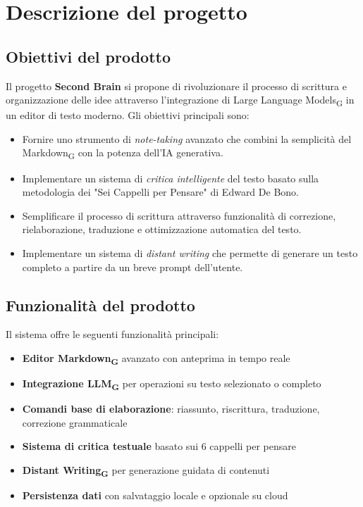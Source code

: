 \documentclass[11pt,a4paper]{article}
\begin{document}
\newpage

\section{Descrizione del progetto}
\subsection{Obiettivi del prodotto}
Il progetto \textbf{Second Brain} si propone di rivoluzionare il processo di scrittura e organizzazione delle idee attraverso l'integrazione di Large Language Models\textsubscript{G} in un editor di testo moderno. Gli obiettivi principali sono:

\begin{itemize}
    \item Fornire uno strumento di \textit{note-taking} avanzato che combini la semplicità del Markdown\textsubscript{G} con la potenza dell'IA generativa.
    \item Implementare un sistema di \textit{critica intelligente} del testo basato sulla metodologia dei "Sei Cappelli per Pensare" di Edward De Bono.
    \item Semplificare il processo di scrittura attraverso funzionalità di correzione, rielaborazione, traduzione e ottimizzazione automatica del testo.
    \item Implementare un sistema di \textit{distant writing} che permette di generare un testo completo a partire da un breve prompt dell'utente.
\end{itemize}


\subsection{Funzionalità del prodotto}
Il sistema offre le seguenti funzionalità principali:

\begin{itemize}
    \item \textbf{Editor Markdown\textsubscript{G}} avanzato con anteprima in tempo reale
    \item \textbf{Integrazione LLM\textsubscript{G}} per operazioni su testo selezionato o completo
    \item \textbf{Comandi base di elaborazione}: riassunto, riscrittura, traduzione, correzione grammaticale
    \item \textbf{Sistema di critica testuale} basato sui 6 cappelli per pensare
    \item \textbf{Distant Writing\textsubscript{G}} per generazione guidata di contenuti
    \item \textbf{Persistenza dati} con salvataggio locale e opzionale su cloud
\end{itemize}
\end{document}
